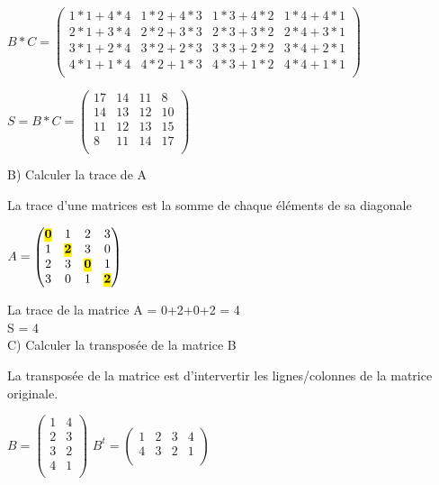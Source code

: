 $
B*C =
\begin{pmatrix}
  1*1+4*4 & 1*2+4*3 & 1*3+4*2 & 1*4+4*1 \\
  2*1+3*4 & 2*2+3*3 & 2*3+3*2 & 2*4+3*1 \\
  3*1+2*4 & 3*2+2*3 & 3*3+2*2 & 3*4+2*1 \\
  4*1+1*4 & 4*2+1*3 & 4*3+1*2 & 4*4+1*1 \\
\end{pmatrix}
$

\vspace{5mm} %

$
S = B*C =
\begin{pmatrix}
  17 & 14 & 11 & 8 \\
  14 & 13 & 12 & 10 \\
  11 & 12 & 13 & 15 \\
  8 & 11 & 14 & 17 \\
\end{pmatrix}
$

\vspace{10mm} %
B) Calculer la trace de A
\vspace{5mm} %

La trace d'une matrices est la somme de chaque éléments de sa diagonale
\vspace{5mm} %

$
A =
\begin{pmatrix}
  \hl{\textbf{0}}  & 1 & 2 & 3 \\
  1 & \hl{\textbf{2}} & 3 & 0 \\
  2 & 3 & \hl{\textbf{0}} & 1 \\
  3 & 0 & 1 & \hl{\textbf{2}} \\
\end{pmatrix}
$
\vspace{3mm} %

La trace de la matrice A = 0+2+0+2 = 4 \\
S = 4 \\

\vspace{10mm} %
C) Calculer la transposée de la matrice B

\vspace{4mm} %
La transposée de la matrice est d'intervertir les lignes/colonnes de la matrice originale.

\vspace{5mm} %
$
B =
\begin{pmatrix}
  1 & 4 \\
  2 & 3 \\
  3 & 2 \\
  4 & 1 \\
\end{pmatrix}
$
\vspace{5mm} %
$
B^{t} =
\begin{pmatrix}
  1 & 2 & 3 & 4 \\
  4 & 3 & 2 & 1 \\
\end{pmatrix}
$

